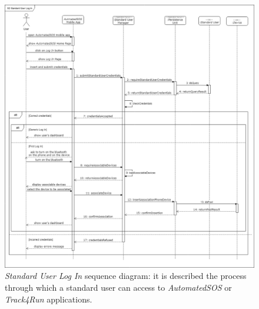 \begin{figure}[H]
  \begin{center}
  	\includegraphics[width=\textwidth]{./img/sequence/appLogIn.png}
    \hspace{0.05\linewidth}
    \centering
    \caption{\textit{Standard User Log In} sequence diagram: it is described the process through which a standard user can access to \textit{AutomatedSOS} or \textit{Track4Run} applications.}
		\label{img:appLogIn}
    \end{center}
\end{figure}

